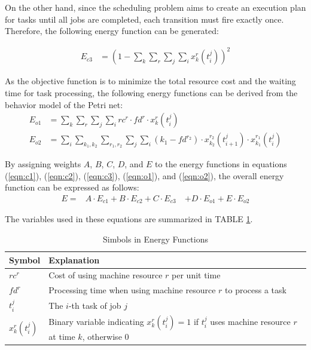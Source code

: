 \documentclass[conference]{IEEEtran}
\begin{document}
On the other hand, since the scheduling problem aims to create an execution plan for tasks until all jobs are completed, each transition must fire exactly once. Therefore, the following energy function can be generated: 

\begin{align} 
E_{c3} &= \left( 1 - \sum_k \sum_r \sum_j \sum_i x_{k}^{r}(t_{i}^{j}) \right)^2 \label{eqn:c3} 
\end{align}

As the objective function is to minimize the total resource cost and the waiting time for task processing, the following energy functions can be derived from the behavior model of the Petri net: 
\begin{align} 
E_{o1} &= \sum_k \sum_r \sum_j \sum_i rc^r \cdot fd^r \cdot x_{k}^{r}(t_{i}^{j}) \label{eqn:o1}\\
E_{o2} &= \sum_i \sum_{k_1,k_2} \sum_{r_1,r_2} \sum_j \sum_i \left( k_1 - fd^{r_2} \right) \cdot x_{k_2}^{r_2}(t_{i+1}^{j}) \cdot x_{k_1}^{r_1}(t_{i}^{j}) \label{eqn:o2} 
\end{align}

By assigning weights $A$, $B$, $C$, $D$, and $E$ to the energy functions in equations (\ref{eqn:c1}), (\ref{eqn:c2}), (\ref{eqn:c3}), (\ref{eqn:o1}), and (\ref{eqn:o2}), the overall energy function can be expressed as follows: 
\begin{align} 
E = &A \cdot E_{c1} + B \cdot E_{c2} + C \cdot E_{c3} \ &+ D \cdot E_{o1} + E \cdot E_{o2} 
\end{align}

The variables used in these equations are summarized in TABLE \ref{variable}.

\begin{table}[h] 
\centering 
\caption{Simbols in Energy Functions} 
\begin{tabularx}{0.45\textwidth}{>{\centering\arraybackslash}p{1.7cm}X} 
\hline 
Symbol  & Explanation \\ \hline 
$rc^r$ & Cost of using machine resource $r$ per unit time  \\
$fd^r$ & Processing time when using machine resource $r$ to process a task \\
$t_{i}^{j}$ & The $i$-th task of job $j$  \\
$x_{k}^{r}(t_{i}^{j})$ & Binary variable indicating $x_{k}^{r}(t_{i}^{j})=1$ if $t_{i}^{j}$ uses machine resource $r$ at time $k$, otherwise 0 \\ \hline

\end{tabularx} 
\label{variable} 
\end{table}
\end{document}

